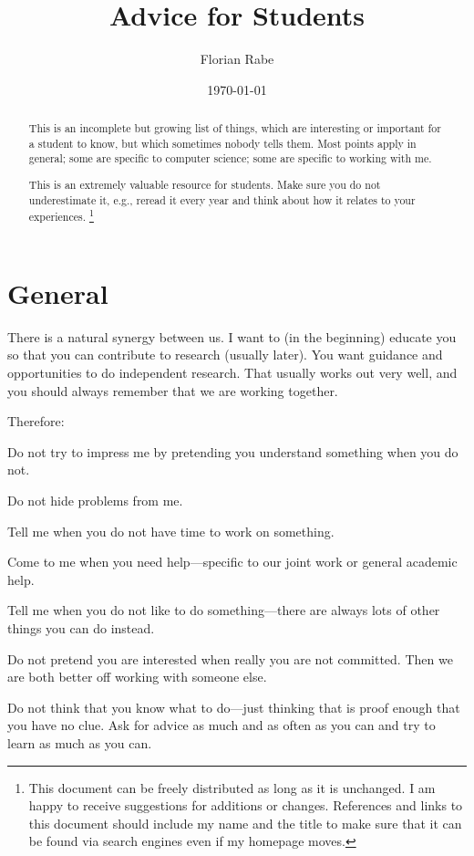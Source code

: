 \documentclass[12pt]{article}
\begin{document}
\title{Advice for Students}
\author{Florian Rabe}
\date{\today}
\maketitle{}

\begin{abstract}
This is an incomplete but growing list of things, which are interesting or important for a student to know, but which sometimes nobody tells them.
Most points apply in general; some are specific to computer science; some are specific to working with me.

This is an extremely valuable resource for students.
Make sure you do not underestimate it, e.g., reread it every year and think about how it relates to your experiences.
\footnote{This document can be freely distributed as long as it is unchanged.
I am happy to receive suggestions for additions or changes.
References and links to this document should include my name and the title to make sure that it can be found via search engines even if my homepage moves.}
\end{abstract}

\tableofcontents

\section{General}

There is a natural synergy between us. I want to (in the beginning) educate you so that you can contribute to research (usually later). You want guidance and opportunities to do independent research. That usually works out very well, and you should always remember that we are working together.

Therefore:
\begin{compactitem}
\item Do not try to impress me by pretending you understand something when you do not.
\item Do not hide problems from me.
\item Tell me when you do not have time to work on something.
\item Come to me when you need help---specific to our joint work or general academic help.
\item Tell me when you do not like to do something---there are always lots of other things you can do instead.
\item Do not pretend you are interested when really you are not committed. Then we are both better off working with someone else.
\item Do not think that you know what to do---just thinking that is proof enough that you have no clue.
Ask for advice as much and as often as you can and try to learn as much as you can.
\end{compactitem}
\end{document}
